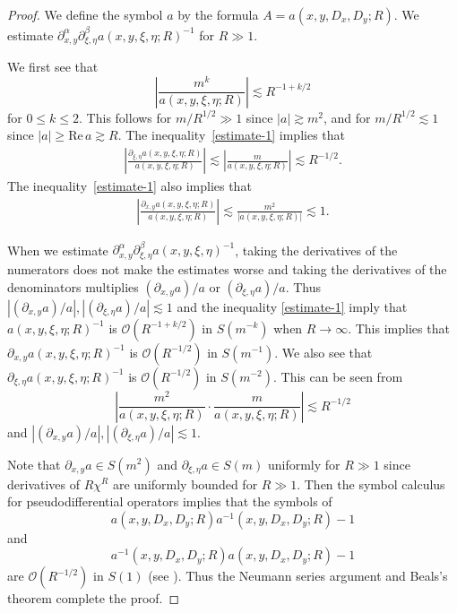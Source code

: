 \documentclass{article}
\theoremstyle{plain}
\theoremstyle{definition}
\theoremstyle{remark}
\newcommand{\RE}{\mathrm{Re}\,}
\begin{document}
\begin{proof}
We define the symbol $a$ by the formula $A=a(x, y, D_x, D_y; R)$. 
We estimate $\partial^{\alpha}_{x, y} \partial^{\beta}_{\xi, \eta}a(x, y, \xi, \eta; R)^{-1}$ 
for $R \gg 1$. 

We first see that  
\begin{equation}\label{estimate-1}
\left|\frac{m^k}
{a(x, y, \xi, \eta; R)}\right|\lesssim R^{-1+k/2}
\end{equation}
for $0\le k \le 2$. 
This follows for $m/R^{1/2}\gg 1$ since $|a|\gtrsim m^2$, 
and for $m/R^{1/2}\lesssim 1$ since $|a|\ge \RE a \gtrsim R$. 
The inequality~\eqref{estimate-1} implies that
\begin{align*}
\left|\frac{\partial_{\xi, \eta} a(x, y, \xi, \eta; R)}
{a(x, y, \xi, \eta; R)}\right|
\lesssim \left|\frac{m}
{a(x, y, \xi, \eta; R)}\right| \lesssim R^{-1/2}. 
\end{align*}
The inequality~\eqref{estimate-1} also implies that
\begin{align*}
\left|\frac{\partial_{x, y} a(x, y, \xi, \eta; R)}
{a(x, y, \xi, \eta; R)}\right|
\lesssim \frac{m^2}
{|a(x, y, \xi, \eta; R)|}\lesssim 1. 
\end{align*} 


When we estimate $\partial^{\alpha}_{x, y} \partial^{\beta}_{\xi, \eta}a(x, y, \xi, \eta)^{-1}$, 
taking the derivatives of the numerators does not make the estimates worse and taking the derivatives of the denominators
multiplies $(\partial_{x, y} a)/a$ or $(\partial_{\xi, \eta}a)/a$. 
Thus $|(\partial_{x, y} a)/a|, |(\partial_{\xi, \eta}a)/a| \lesssim 1$ and the inequality \eqref{estimate-1} imply 
that $a(x, y, \xi, \eta; R)^{-1}$ is $\mathcal{O}(R^{-1+k/2})$ in $S(m^{-k})$ when $R\to \infty$. 
This implies that $\partial_{x, y} a(x, y, \xi, \eta; R)^{-1}$ is $\mathcal{O}(R^{-1/2})$ in $S(m^{-1})$. 
We also see that $\partial_{\xi, \eta} a(x, y, \xi, \eta; R)^{-1}$ is $\mathcal{O}(R^{-1/2})$ in $S(m^{-2})$.  
This can be seen from 
\[
\left|\frac{m^2}
{a(x, y, \xi, \eta; R)}\cdot \frac{m}
{a(x, y, \xi, \eta; R)}\right| \lesssim R^{-1/2} 
\]
and $|(\partial_{x, y} a)/a|, |(\partial_{\xi, \eta}a)/a| \lesssim 1$. 

Note that $\partial_{x, y} a \in S(m^2)$ and $\partial_{\xi, \eta}a \in S(m)$ uniformly for $R\gg1$ since 
derivatives of $R\chi^R$ are uniformly bounded for $R\gg 1$. 
Then the symbol calculus for pseudodifferential operators implies that 
the symbols of 
\[
a(x, y, D_x, D_y; R)a^{-1}(x, y, D_x, D_y; R)-1
\]
and 
\[
a^{-1}(x, y, D_x, D_y; R)a(x, y, D_x, D_y; R)-1
\]
are $\mathcal{O}(R^{-1/2})$ in $S(1)$ (see \cite[Chapter~4]{Z}). 
Thus the Neumann series argument and Beals's theorem complete the proof.
\end{proof}
\end{document}
